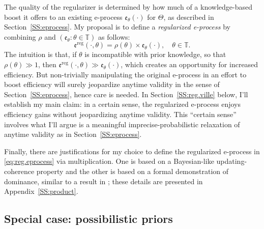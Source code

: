 \documentclass[a4paper, 12pt]{article}
\theoremstyle{plain}
\theoremstyle{definition}
\theoremstyle{remark}
\newcommand{\ZZ}{\mathbb{Z}}
\newcommand{\TT}{\mathbb{T}}
\newcommand{\eval}{\mathfrak{e}}
\begin{document}
The quality of the regularizer is determined by how much of a knowledge-based boost it offers to an existing e-process $\eval_\theta(\cdot)$ for $\Theta$, as described in Section~\ref{SS:eprocess}.
My proposal is to define a {\em regularized e-process} by combining $\rho$ and $(\eval_\theta: \theta \in \TT)$ as follows: 
\begin{equation}
\label{eq:reg.eprocess}
\eval^\text{reg}(\cdot, \theta) = \rho(\theta) \times \eval_\theta(\cdot), \quad \theta \in \TT.
\end{equation}
The intuition is that, if $\theta$ is incompatible with prior knowledge, so that $\rho(\theta) \gg 1$, then $\eval^\text{reg}(\cdot,\theta) \gg \eval_\theta(\cdot)$, which creates an opportunity for increased efficiency.  But non-trivially manipulating the original e-process in an effort to boost efficiency will surely jeopardize anytime validity in the sense of Section~\ref{SS:eprocess}, hence care is needed.  In Section~\ref{SS:reg.ville} below, I'll establish my main claim: in a certain sense, the regularized e-process enjoys efficiency gains without jeopardizing anytime validity.  This ``certain sense'' involves what I'll argue is a meaningful imprecise-probabilistic relaxation of anytime validity as in Section~\ref{SS:eprocess}.

Finally, there are justifications for my choice to define the regularized e-process in \eqref{eq:reg.eprocess} via multiplication.  One is based on a Bayesian-like updating-coherence property and the other is based on a formal demonstration of dominance, similar to a result in \citet{vovk.wang.2021}; these details are presented in Appendix~\ref{SS:product}.



\subsection{Special case: possibilistic priors}
\label{SS:possibilistic.case}
\end{document}
